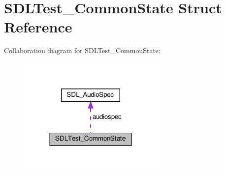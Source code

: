 \hypertarget{structSDLTest__CommonState}{}\section{S\+D\+L\+Test\+\_\+\+Common\+State Struct Reference}
\label{structSDLTest__CommonState}


Collaboration diagram for S\+D\+L\+Test\+\_\+\+Common\+State\+:\nopagebreak
\begin{figure}[H]
\begin{center}
\leavevmode
\includegraphics[width=204pt]{structSDLTest__CommonState__coll__graph}
\end{center}
\end{figure}
